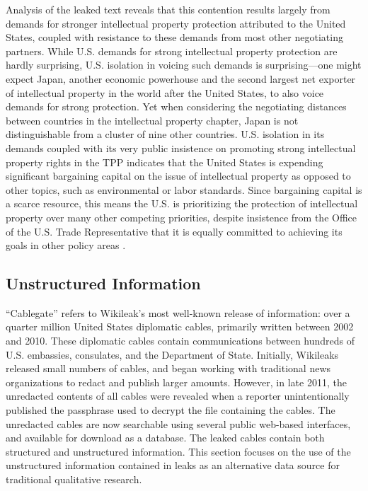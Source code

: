 \documentclass[12pt]{article}
\begin{document}
Analysis of the leaked text reveals that this contention results largely from demands for stronger intellectual 
property protection attributed to the United States, 
coupled with resistance to these demands from most other negotiating partners. While U.S. demands for 
strong intellectual property protection are hardly surprising, U.S. isolation in voicing such demands 
is surprising---one might expect Japan, another economic powerhouse and the second largest net exporter of 
intellectual property in the world after the United States, to also voice demands for strong protection. Yet when 
considering the negotiating distances between countries in the intellectual property chapter, Japan 
is not distinguishable from a cluster of nine other countries. U.S. isolation in its demands coupled with 
its very public insistence on promoting strong intellectual property rights in the TPP indicates that the 
United States is expending significant bargaining capital on the issue of intellectual property as opposed to 
other topics, such as environmental or labor standards. Since bargaining capital is a scarce resource, this 
means the U.S. is prioritizing the protection of intellectual property over many other competing priorities, 
despite insistence from the Office of the U.S. Trade Representative that it is equally committed to 
achieving its goals in other policy areas \citep{u.s._trade_representative????trans-pacific}. 

\subsection{Unstructured Information}

``Cablegate'' refers to Wikileak's most well-known release of information: over a quarter million 
United States diplomatic cables, primarily written between 2002 and 2010. These diplomatic cables 
contain communications between hundreds of U.S. embassies, consulates, and the Department of State. 
Initially, Wikileaks released small numbers of cables, and began working with traditional news 
organizations to redact and publish larger amounts. However, in late 2011, the unredacted 
contents of all cables were revealed when a reporter unintentionally published the passphrase used 
to decrypt the file containing the cables. The unredacted cables are now searchable 
using several public web-based interfaces, and available for download as a database. 
The leaked cables contain both structured and unstructured information. 
This section focuses on the use of the unstructured information contained in leaks as an alternative 
data source for traditional qualitative research.
\end{document}
